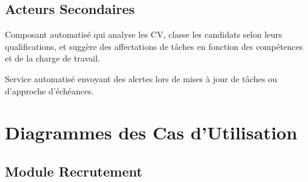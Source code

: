 \documentclass[11pt,a4paper]{report}
\begin{document}
\section{Acteurs Secondaires}

\begin{tcolorbox}[enhanced, colback=lightgray, colframe=secondarycolor, arc=3mm, boxrule=1pt]
    \begin{description}[style=nextline, font=\bfseries\color{secondarycolor}]
        \item[Module IA]
              Composant automatisé qui analyse les CV, classe les candidats selon leurs qualifications, et suggère des affectations de tâches en fonction des compétences et de la charge de travail.

        \item[Système de Notifications]
              Service automatisé envoyant des alertes lors de mises à jour de tâches ou d'approche d'échéances.
    \end{description}
\end{tcolorbox}

\chapter{Diagrammes des Cas d'Utilisation}

\section{Module Recrutement}
\end{document}
